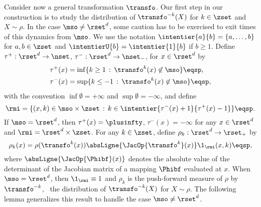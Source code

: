 
Consider now a general transformation $\transfo$. %
Our first step in our construction is to study
 the distribution of $\transfo^{-k}(X)$ for $k \in \zset$
and $X\sim \rho$. In the case $\mso \neq \rset^d$, %
some caution has to be exercised to exit times of this dynamics from $\mso$.  We use the notation
$\intentier{a}{b} = \{a,\dots, b\}$ for $a,b \in \zset$ and $\intentierU{b} = \intentier{1}{b}$ if $b \geq 1$. Define
$\tau^{+} : \rset^d \to \nset$, $\tau^{-} : \rset^d \to \nset_-$, for
$x \in \rset^d$ by
\begin{align}
\label{eq:definition-tau-+--}
&\tau^{+}(x)=\inf\{k\geq 1\, :  \,  \transfo^{k}(x) \not \in \mso\} \eqsp, \\
&\tau^{-}(x)=\sup\{k\leq -1\, :  \,  \transfo^{k}(x) \not \in \mso\} \eqsp,
\end{align}
with the convention $\inf \emptyset = +\infty$ and
$\sup \emptyset = - \infty$, and define
\begin{equation}
  \label{eq:def_rmi}
  \rmi = \{(x,k) \in \mso\times \zset\,:\, k \in
\intentier{\tau^-(x)+1}{\tau^+(x)-1}\} \eqsp.
\end{equation}
If $\mso = \rset^{d}$, then $\tau^{+}(x) = \plusinfty$, $\tau^{-}(x) = -\infty$ for any $x \in \rset^d$ and
$\rmi = \rset^{d} \times \zset$. For any $k \in \zset$, define $\rho_k : \rset^d \to \rset_+$ by
\begin{equation}
\label{eq:definition-rho-k}
    \rho_k(x)= \rho(\transfo^k(x))  \absLigne{\JacOp{\transfo^k}(x)} \1_{\rmi}(x,k)\eqsp,
\end{equation}
where $\absLigne{\JacOp{\Phibf}(x)}$ denotes the absolute value of the determinant of the Jacobian matrix of a mapping $\Phibf$ evaluated at $x$. When $\mso = \rset^{d}$, then $\1_{\rmi}\equiv 1$ and
$\rho_k$ is the push-forward measure of $\rho$ by $\transfo^{-k}$, \ie~the distribution of $\transfo^{-k}(X)$ for $X \sim \rho$.
The following lemma generalizes this result to handle the case $\mso \neq \rset^{d}$.

